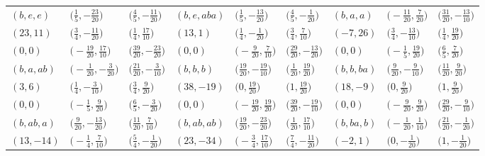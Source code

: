 \documentclass[pdftex]{sigma}
\theoremstyle{definition}
\numberwithin{equation}{section}
\begin{document}
\begin{landscape}
\begin{table}[th]
\begin{tabular}{|lll|lll|lll|}
\\\hline
$(b, e, e)$ & $\bigl(\frac{1}{5}, -\frac{23}{20}\bigr)$ & $\bigl(\frac{4}{5}, -\frac{11}{20}\bigr)$ & $(b, e, aba)$ & $\bigl(\frac{1}{5}, -\frac{13}{20}\bigr)$ & $\bigl(\frac{4}{5}, -\frac{1}{20}\bigr)$ & $(b, a, a)$ & $\bigl(-\frac{11}{20}, \frac{7}{20}\bigr)$ & $\bigl(\frac{31}{20}, -\frac{13}{10}\bigr)$
\\
$(23, 11)$ & $\bigl(\frac{3}{4}, -\frac{11}{20}\bigr)$ & $\bigl(\frac{1}{4}, \frac{17}{10}\bigr)$ & $(13, 1)$ & $\bigl(\frac{1}{4}, -\frac{1}{20}\bigr)$ & $\bigl(\frac{3}{4}, \frac{7}{10}\bigr)$ & $(-7, 26)$ & $\bigl(\frac{3}{4}, -\frac{13}{10}\bigr)$ & $\bigl(\frac{1}{4}, \frac{19}{20}\bigr)$
\\
$(0, 0)$ & $\bigl(-\frac{19}{20}, \frac{17}{10}\bigr)$ & $\bigl(\frac{39}{20}, -\frac{23}{20}\bigr)$ & $(0, 0)$ & $\bigl(-\frac{9}{20}, \frac{7}{10}\bigr)$ & $\bigl(\frac{29}{20}, -\frac{13}{20}\bigr)$ & $(0, 0)$ & $\bigl(-\frac{1}{5}, \frac{19}{20}\bigr)$ & $\bigl(\frac{6}{5}, \frac{7}{20}\bigr)$
\\\hline
$(b, a, ab)$ & $\bigl(-\frac{1}{20}, -\frac{3}{20}\bigr)$ & $\bigl(\frac{21}{20}, -\frac{3}{10}\bigr)$ & $(b, b, b)$ & $\bigl(\frac{19}{20}, -\frac{19}{10}\bigr)$ & $\bigl(\frac{1}{20}, \frac{19}{20}\bigr)$ & $(b, b, ba)$ & $\bigl(\frac{9}{20}, -\frac{9}{10}\bigr)$ & $\bigl(\frac{11}{20}, \frac{9}{20}\bigr)$
\\
$(3, 6)$ & $\bigl(\frac{1}{4}, -\frac{3}{10}\bigr)$ & $\bigl(\frac{3}{4}, \frac{9}{20}\bigr)$ & $(38, -19)$ & $\bigl(0, \frac{19}{20}\bigr)$ & $\bigl(1, \frac{19}{20}\bigr)$ & $(18, -9)$ & $\bigl(0, \frac{9}{20}\bigr)$ & $\bigl(1, \frac{9}{20}\bigr)$
\\
$(0, 0)$ & $\bigl(-\frac{1}{5}, \frac{9}{20}\bigr)$ & $\bigl(\frac{6}{5}, -\frac{3}{20}\bigr)$ & $(0, 0)$ & $\bigl(-\frac{19}{20}, \frac{19}{20}\bigr)$ & $\bigl(\frac{39}{20}, -\frac{19}{10}\bigr)$ & $(0, 0)$ & $\bigl(-\frac{9}{20}, \frac{9}{20}\bigr)$ & $\bigl(\frac{29}{20}, -\frac{9}{10}\bigr)$
\\\hline
$(b, ab, a)$ & $\bigl(\frac{9}{20}, -\frac{13}{20}\bigr)$ & $\bigl(\frac{11}{20}, \frac{7}{10}\bigr)$ & $(b, ab, ab)$ & $\bigl(\frac{19}{20}, -\frac{23}{20}\bigr)$ & $\bigl(\frac{1}{20}, \frac{17}{10}\bigr)$ & $(b, ba, b)$ & $\bigl(-\frac{1}{20}, \frac{1}{10}\bigr)$ & $\bigl(\frac{21}{20}, -\frac{1}{20}\bigr)$
\\
$(13, -14)$ & $\bigl(-\frac{1}{4}, \frac{7}{10}\bigr)$ & $\bigl(\frac{5}{4}, -\frac{1}{20}\bigr)$ & $(23, -34)$ & $\bigl(-\frac{3}{4}, \frac{17}{10}\bigr)$ & $\bigl(\frac{7}{4}, -\frac{11}{20}\bigr)$ & $(-2, 1)$ & $\bigl(0, -\frac{1}{20}\bigr)$ & $\bigl(1, -\frac{1}{20}\bigr)$

\end{tabular}
\end{table}
\end{landscape}
\end{document}
